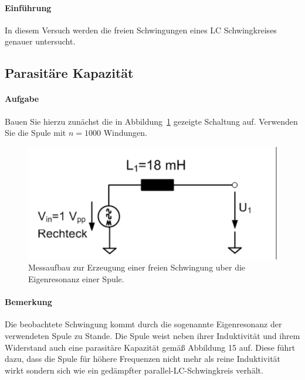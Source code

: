 \documentclass[10pt]{scrreprt}
\begin{document}
        \paragraph{Einführung}
        In diesem Versuch werden die freien Schwingungen eines LC Schwingkreises genauer untersucht.

        \subsection{Parasitäre Kapazität}
        \paragraph{Aufgabe}
        Bauen Sie hierzu zunächst die in Abbildung~\ref{fig:abb14} gezeigte Schaltung auf. Verwenden
        Sie die Spule mit $n = 1000$ Windungen.
        \begin{center}
            \begin{figure}[H]
                \includegraphics[width=\textwidth]{Abbildung14.png}
                \caption{Messaufbau zur Erzeugung einer freien Schwingung uber die Eigenresonanz einer Spule.}
                \label{fig:abb14}
            \end{figure}
        \end{center}

        \paragraph{Bemerkung}
        Die beobachtete Schwingung kommt durch die sogenannte Eigenresonanz der verwendeten
        Spule zu Stande. Die Spule weist neben ihrer Induktivität und ihrem
        Widerstand auch eine parasitäre Kapazität gemäß Abbildung 15 auf. Diese führt
        dazu, dass die Spule für höhere Frequenzen nicht mehr als reine Induktivität wirkt
        sondern sich wie ein gedämpfter parallel-LC-Schwingkreis verhält.
\end{document}
